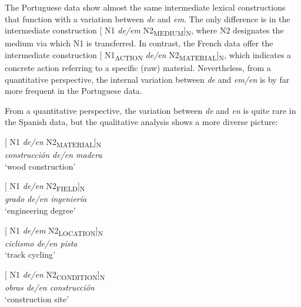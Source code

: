 \documentclass[output=paper]{langsci/langscibook}
\begin{document}
The Portuguese data show almost the same intermediate lexical constructions that function with a variation between \textit{de} and \textit{em}. The only difference is in the intermediate construction [ N1 \textit{de/em} N2\textsubscript{MEDIUM}]\textsubscript{N}, where N2 designates the medium via which N1 is transferred. In contrast, the French data offer the intermediate construction [ N1\textsubscript{ACTION} \textit{de/en} N2\textsubscript{MATERIAL}]\textsubscript{N}, which indicates a concrete action referring to a specific (raw) material. Nevertheless, from a quantitative perspective, the internal variation between \textit{de} and \textit{em/en} is by far more frequent in the Portuguese data.

 From a quantitative perspective, the variation between \textit{de} and \textit{en} is quite rare in the Spanish data, but the qualitative analysis shows a more diverse picture:\\ 

\begin{exe}\ex\begin{minipage}[t]{0.4\textwidth}    %
[ N1 \textit{de/en} N2\textsubscript{MATERIAL}]\textsubscript{N}\\
\textit{construcción de/en madera }\\
`wood construction'
\end{minipage}\hfill%
\begin{minipage}[t]{0.45\textwidth}
[ N1 \textit{de/en} N2\textsubscript{FIELD}]\textsubscript{N}\\
\textit{grado de/en ingeniería}\\
`engineering degree'
\end{minipage}
\end{exe}

\begin{exe}\ex\begin{minipage}[t]{0.4\textwidth}    %
[ N1 \textit{de/em} N2\textsubscript{LOCATION}]\textsubscript{N}\\
\textit{ciclismo de/en pista}\\
`track cycling'
\end{minipage}\hfill%
\begin{minipage}[t]{0.45\textwidth}
[ N1 \textit{de/en} N2\textsubscript{CONDITION}]\textsubscript{N}\\
\textit{obras de/en construcción}\\
`construction site'
\end{minipage}\end{exe}
\end{document}

